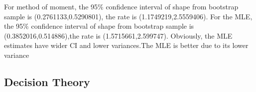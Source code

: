 \documentclass[]{article}
\begin{document}
For method of moment, the 95\% confidence interval of shape from
bootstrap sample is (0.2761133,0.5290801), the rate is
(1.1749219,2.5559406). For the MLE, the 95\% confidence interval of
shape from bootstrap sample is (0.3852016,0.514886),the rate is
(1.5715661,2.599747). Obviously, the MLE estimates have wider CI and
lower variances.The MLE is better due to its lower variance

\subsection{Decision Theory}\label{decision-theory}
\end{document}
